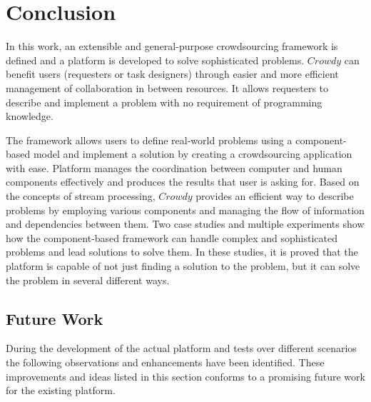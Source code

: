 \chapter{Conclusion}
\label{chap:conclusion}

In this work, an extensible and general-purpose crowdsourcing framework is defined and a platform is developed to solve sophisticated problems. $Crowdy$ can benefit users (requesters or task designers) through easier and more efficient management of collaboration in between resources. It allows requesters to describe and implement a problem with no requirement of programming knowledge. 

The framework allows users to define real-world problems using a component-based model and implement a solution by creating a crowdsourcing application with ease. Platform manages the coordination between computer and human components effectively and produces the results that user is asking for. Based on the concepts of stream processing, $Crowdy$ provides an efficient way to describe problems by employing various components and managing the flow of information and dependencies between them. Two case studies and multiple experiments show how the component-based framework can handle complex and sophisticated problems and lead solutions to solve them. In these studies, it is proved that the platform is capable of not just finding a solution to the problem, but it can solve the problem in several different ways.

\section{Future Work}
During the development of the actual platform and tests over different scenarios the following observations and enhancements have been identified. These improvements and ideas listed in this section conforms to a promising future work for the existing platform. 

